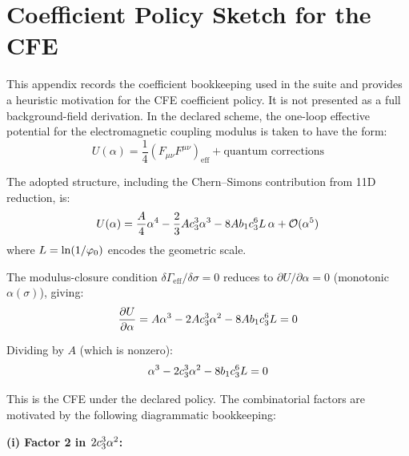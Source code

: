 \section{Coefficient Policy Sketch for the CFE}

This appendix records the coefficient bookkeeping used in the suite and provides a
heuristic motivation for the CFE coefficient policy. It is not presented as a full
background-field derivation. In the declared scheme, the one-loop effective potential
for the electromagnetic coupling modulus is taken to have the form:
\begin{equation}
    U(\alpha) = \frac{1}{4}(F_{\mu\nu}F^{\mu\nu})_{\text{eff}} 
        + \text{quantum corrections}
\end{equation}

The adopted structure, including the Chern--Simons contribution from 11D reduction, is:
\begin{equation}
    U(\alpha) = \frac{A}{4}\alpha^4 - \frac{2}{3}Ac_3^3\alpha^3 
        - 8Ab_1c_3^6 L\,\alpha + \mathcal{O}(\alpha^5)
    \label{eq:potential}
\end{equation}
where $L = \ln(1/\varphi_0)$ encodes the geometric scale.

The modulus-closure condition $\delta\Gamma_{\mathrm{eff}}/\delta\sigma=0$ reduces to
$\partial U/\partial\alpha = 0$ (monotonic $\alpha(\sigma)$), giving:
\begin{equation}
    \frac{\partial U}{\partial\alpha} = A\alpha^3 - 2Ac_3^3\alpha^2 
        - 8Ab_1c_3^6 L = 0
    \label{eq:stationarity}
\end{equation}

Dividing by $A$ (which is nonzero):
\begin{equation}
    \alpha^3 - 2c_3^3\alpha^2 - 8b_1c_3^6 L = 0
    \label{eq:CFE-appendix}
\end{equation}

This is the CFE under the declared policy. The combinatorial factors are motivated by
the following diagrammatic bookkeeping:

\textbf{(i) Factor 2 in $2c_3^3\alpha^2$:}

